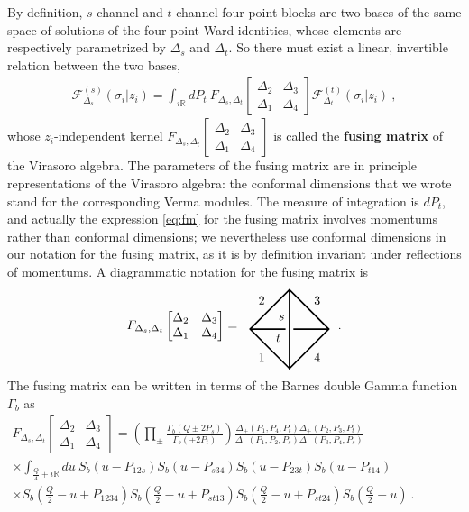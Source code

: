 \documentclass[12pt, a4paper, notitlepage, twoside]{report}
\numberwithin{equation}{section}
\theoremstyle{break}
\begin{document}
By definition, $s$-channel and $t$-channel four-point blocks are two bases of the same space of solutions of the four-point Ward identities, whose elements are respectively parametrized by $\Delta_s$ and $\Delta_t$.
So there must exist a linear, invertible relation between the two bases, 
\begin{align}
 \mathcal{F}^{(s)}_{\Delta_s}(\sigma_i|z_i) = \int_{i\mathbb{R}}dP_t\ F_{\Delta_s,\Delta_t}\begin{bmatrix} \Delta_2 & \Delta_3 \\ \Delta_1 & \Delta_4 \end{bmatrix} \mathcal{F}^{(t)}_{\Delta_t}(\sigma_i|z_i)\ ,
 \label{eq:fusrel}
\end{align}
whose $z_i$-independent kernel $F_{\Delta_s,\Delta_t}\begin{bmatrix} \Delta_2 & \Delta_3 \\ \Delta_1 & \Delta_4 \end{bmatrix}$ is called the \textbf{\boldmath fusing matrix} of the Virasoro algebra.
The parameters of the fusing matrix are in principle representations of the Virasoro algebra: the conformal dimensions that we wrote stand for the corresponding Verma modules. The measure of integration is $dP_t$, and actually the expression \eqref{eq:fm} for the fusing matrix involves momentums rather than conformal dimensions; we nevertheless use conformal dimensions in our notation for the fusing matrix, as it is by definition invariant under reflections of momentums.
A diagrammatic notation for the fusing matrix is 
\begin{align}
 F_{\Delta_s,\Delta_t}\begin{bmatrix} \Delta_2 & \Delta_3 \\ \Delta_1 & \Delta_4 \end{bmatrix} = \ \ 
\begin{tikzpicture}[baseline=(current  bounding  box.center), very thick, scale = .55]
\draw (0, -2) -- node [below left] {$1$} (-2, 0) -- node [above left] {$2$} (0, 2) -- node [above right] {$3$} (2, 0) -- node [below right] {$4$} (0, -2) -- (0, 2);
\draw (-2, 0) -- (-.2, 0) node [below left] {$t$}; \draw (.2, 0) -- (2, 0);
\node [above left] at (0, .2) {$s$};
\end{tikzpicture}
\ \ .
\end{align}
The fusing matrix can be written in terms of the Barnes double Gamma function $\Gamma_b$ as \cite{tv12} 
\begin{multline}
 F_{\Delta_s,\Delta_t}\begin{bmatrix} \Delta_2 & \Delta_3 \\ \Delta_1 & \Delta_4 \end{bmatrix} = \left(\prod_{\pm}\frac{\Gamma_b(Q\pm 2P_s)}{\Gamma_b(\pm 2P_t)}\right) \frac{\Delta_+(P_1,P_4,P_t)\Delta_+(P_2,P_3,P_t)}{\Delta_-(P_1,P_2,P_s)\Delta_-(P_3,P_4,P_s)}
 \\
 \times \int_{\frac{Q}{4}+i\mathbb{R}}du \ S_b(u-P_{12s})S_b(u-P_{s34})S_b(u-P_{23t})S_b(u-P_{t14}) \hspace{3cm}
 \\
 \times S_b(\tfrac{Q}{2}-u+P_{1234}) S_b(\tfrac{Q}{2}-u+P_{st13}) S_b(\tfrac{Q}{2}-u+P_{st24})S_b(\tfrac{Q}{2}-u) \ .
 \label{eq:fm}
\end{multline}
\end{document}
